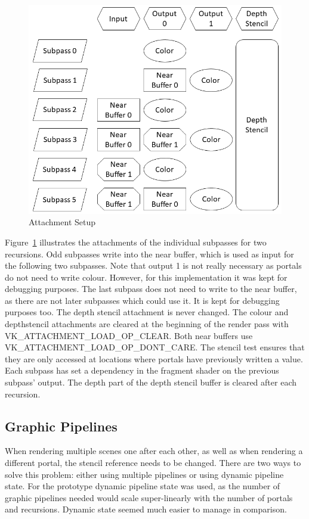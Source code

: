 \begin{figure}[h]
	\includegraphics[width=\linewidth]{images/attachmentsetup.png}
	\caption{Attachment Setup}
	\label{fig:attachments}
\end{figure}

Figure~\ref{fig:attachments} illustrates the attachments of the individual subpasses for two recursions. Odd subpasses write into the near buffer, which is used as input for the following two subpasses.  Note that output 1 is not really necessary as portals do not need to write colour. However, for this implementation it was kept for debugging purposes. The last subpass does not need to write to the near buffer, as there are not later subpasses which could use it. It is kept for debugging purposes too. The depth stencil attachment is never changed. The colour and depthstencil attachments are cleared at the beginning of the render pass with VK\_ATTACHMENT\_LOAD\_OP\_CLEAR. Both near buffers use VK\_ATTACHMENT\_LOAD\_OP\_DONT\_CARE. The stencil test ensures that they are only accessed at locations where portals have previously written a value. Each subpass has set a dependency in the fragment shader on the previous subpass' output. The depth part of the depth stencil buffer is cleared after each recursion.


\subsection{Graphic Pipelines}
When rendering multiple scenes one after each other, as well as when rendering a different portal, the stencil reference needs to be changed. There are two ways to solve this problem: either using multiple pipelines or using dynamic pipeline state. For the prototype dynamic pipeline state was used, as the number of graphic pipelines needed would scale super-linearly with the number of portals and recursions. Dynamic state seemed much easier to manage in comparison.


